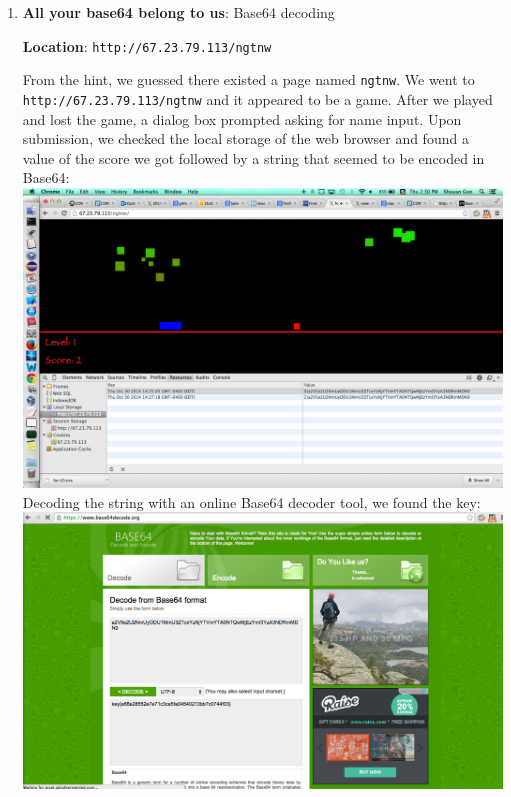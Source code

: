 \documentclass[12pt]{article}
\begin{document}
\begin{enumerate}[1.]
\newpage

\item \textbf{All your base64 belong to us}: Base64 decoding

\textbf{Location}: \texttt{http://67.23.79.113/ngtnw}

From the hint, we guessed there existed a page named \texttt{ngtnw}. We went to \\ \texttt{http://67.23.79.113/ngtnw} and it appeared to be a game. After we played and lost the game, a dialog box prompted asking for name input. Upon submission, we checked the local storage of the web browser and found a value of the score we got followed by a string that seemed to be encoded in Base64: \\

\includegraphics[scale=0.25]{images/flag9a} \\

Decoding the string with an online Base64 decoder tool, we found the key: \\

\includegraphics[scale=0.25]{images/flag9b} \\


\end{enumerate}
\end{document}

